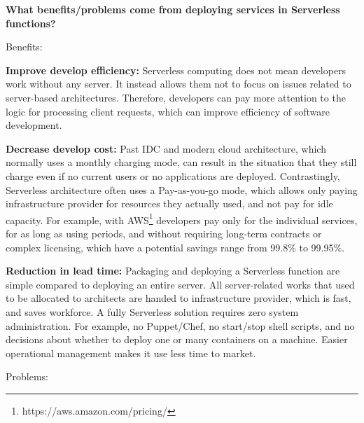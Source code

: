 \documentclass[11pt]{article}
\begin{document}
\pagestyle{empty}

{\bf What benefits/problems come from deploying services in Serverless functions?}

Benefits:
\begin{itemize*}
  \item {\bf Improve develop efficiency:} Serverless computing does not mean developers work without any server. It instead allows them not to focus on issues related to server-based architectures. Therefore, developers can pay more attention to the logic for processing client requests, which can improve efficiency of software development. 
  \item {\bf Decrease develop cost:} Past IDC and modern cloud architecture, which normally uses a monthly charging mode, can result in the situation that they still charge even if no current users or no applications are deployed. Contrastingly, Serverless architecture often uses a Pay-as-you-go mode, which allows only paying infrastructure provider for resources they actually used, and not pay for idle capacity. For example, with AWS\footnote{https://aws.amazon.com/pricing/} developers pay only for the individual services, for as long as using periods, and without requiring long-term contracts or complex licensing, which have a potential savings range from 99.8\% to 99.95\%\cite{no1}. 
  \item {\bf Reduction in lead time:} Packaging and deploying a Serverless function are simple compared to deploying an entire server. All server-related works that used to be allocated to architects are handed to infrastructure provider, which is fast, and saves workforce. A fully Serverless solution requires zero system administration. For example, no Puppet/Chef, no start/stop shell scripts, and no decisions about whether to deploy one or many containers on a machine\cite{no2}. Easier operational management makes it use less time to market. 
\end{itemize*}
Problems:
\end{document}
